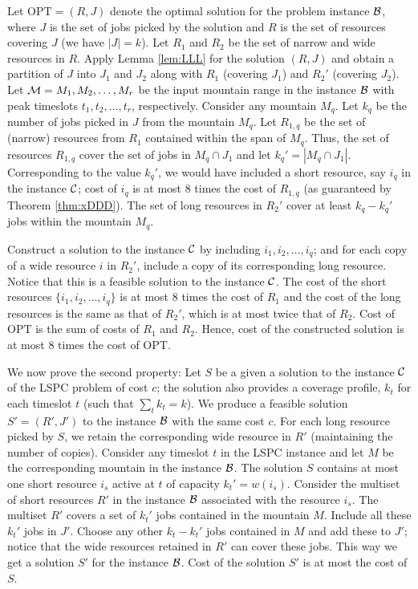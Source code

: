 \documentclass[11pt]{article}
\newcommand{\opt}{{\mathrm{OPT}}}
\newcommand{\lspc}{{\sc LSPC}}
\newcommand{\cC}{{\cal C}}
\newcommand{\calM} {{\cal M}}
\newcommand{\cB} {{\cal B}}
\begin{document}
Let $\opt=(R,J)$ denote the optimal solution for the problem instance $\cB$,
where $J$ is the set of jobs picked by the solution and $R$ is the set of resources covering $J$ (we have $|J|=k$).
Let $R_1$ and $R_2$ be the set of narrow and wide resources in $R$.
Apply Lemma \ref{lem:LLL} for the solution $(R,J)$ and obtain a partition of $J$ into $J_1$ and $J_2$
along with $R_1$ (covering $J_1$) and $R_2'$ (covering $J_2$).
Let $\calM = M_1, M_2, \ldots, M_r$ be the input mountain range in the instance $\cB$ with peak timeslots
$t_1, t_2, \ldots, t_r$, respectively. Consider any mountain $M_q$.
Let $k_q$ be the number of jobs picked in $J$ from the mountain $M_q$.
Let $R_{1,q}$ be the set of (narrow) resources from $R_1$ contained within the span of $M_q$.
Thus, the set of resources $R_{1,q}$ cover the set of jobs in $M_q\cap J_1$ and let $k_q' = |M_q\cap J_1|$.
Corresponding to the value $k_q'$, we would have included a short resource, say $i_q$
in the instance $\cC$; cost of $i_q$ is at most $8$ times the cost of $R_{1,q}$ 
(as guaranteed by Theorem \ref{thm:xDDD}).
The set of long resources in $R_2'$ cover at least $k_q-k_q'$ jobs within the mountain $M_q$.

Construct a solution to the instance $\cC$ by including $i_1, i_2, \ldots, i_q$; 
and for each copy of a wide resource $i$ in $R_2'$,
include a copy of its corresponding long resource. Notice that this is a feasible solution to the instance $\cC$.
The cost of the short resources $\{i_1, i_2, \ldots, i_q\}$ is at most $8$ times the cost of $R_1$
and the cost of the long resources is the same as that of $R_2'$, which is at most twice that of $R_2$.
Cost of $\opt$ is the sum of costs of $R_1$ and $R_2$.
Hence, cost of the constructed solution is at most $8$ times the cost of $\opt$.

We now prove the second property:
Let $S$ be a given a solution to the instance $\cC$ of the {\lspc} problem of cost $c$;
the solution also provides a coverage profile, $k_t$ for each timeslot $t$ (such that $\sum_t k_t = k$).
We produce a feasible solution $S'=(R',J')$ to the instance $\cB$ with the same cost $c$. 
For each long resource picked by $S$, we retain the corresponding
wide resource in $R'$ (maintaining the number of copies).
Consider any timeslot $t$ in the {\lspc} instance and let $M$ be the corresponding mountain in the instance $\cB$.
The solution $S$ contains at most one short resource $i_s$ active at $t$ of capacity $k_t'=w(i_s)$.
Consider the multiset of short resources $R'$ in the instance $\cB$ associated with the resource $i_s$.
The multiset $R'$ covers a set of $k_t'$ jobs contained in the mountain $M$.
Include all these $k_t'$ jobs in $J'$. Choose any other $k_t-k_t'$ jobs contained in $M$
and add these to $J'$; notice that the wide resources retained in $R'$ can cover these jobs.
This way we get a solution $S'$ for the instance $\cB$.
Cost of the solution $S'$ is at most the cost of $S$.
\\
\end{document}
